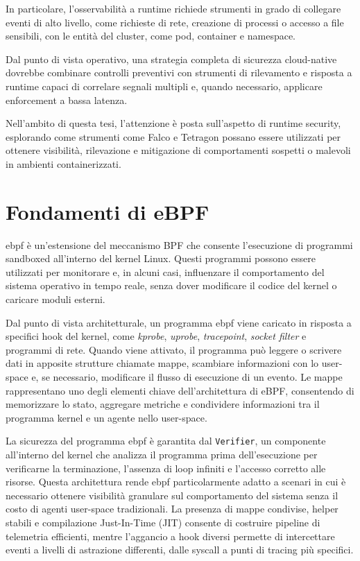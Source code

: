 \documentclass[12pt,a4paper,openright,twoside]{book}
\newcommand{\userspace}{\mbox{user-space}\xspace}
\begin{document}
In particolare, l'osservabilità a runtime richiede strumenti in grado di collegare eventi di alto livello, come richieste di rete, creazione di processi o accesso a file sensibili, con le entità del cluster, come pod, container e namespace.

Dal punto di vista operativo, una strategia completa di sicurezza cloud-native dovrebbe combinare controlli preventivi con strumenti di rilevamento e risposta a runtime capaci di correlare segnali multipli e, quando necessario, applicare enforcement a bassa latenza. 

Nell'ambito di questa tesi, l'attenzione è posta sull'aspetto di runtime security, esplorando come strumenti come Falco e Tetragon possano essere utilizzati per ottenere visibilità, rilevazione e mitigazione di comportamenti sospetti o malevoli in ambienti containerizzati.

\section{Fondamenti di eBPF}
\label{sec:eBPF-fundamentals}
\ac{ebpf} è un'estensione del meccanismo BPF che consente l'esecuzione di programmi sandboxed all'interno del kernel Linux. Questi programmi possono essere utilizzati per monitorare e, in alcuni casi, influenzare il comportamento del sistema operativo in tempo reale, senza dover modificare il codice del kernel o caricare moduli esterni.

Dal punto di vista architetturale, un programma \ac{ebpf} viene caricato in risposta a specifici hook del kernel, come \textit{kprobe}, \textit{uprobe}, \textit{tracepoint}, \textit{socket filter} e programmi di rete. Quando viene attivato, il programma può leggere o scrivere dati in apposite strutture chiamate mappe, scambiare informazioni con lo \userspace e, se necessario, modificare il flusso di esecuzione di un evento. Le mappe rappresentano uno degli elementi chiave dell'architettura di eBPF, consentendo di memorizzare lo stato, aggregare metriche e condividere informazioni tra il programma kernel e un agente nello \userspace.

La sicurezza del programma \ac{ebpf} è garantita dal \texttt{Verifier}, un componente all'interno del kernel che analizza il programma prima dell'esecuzione per verificarne la terminazione, l'assenza di loop infiniti e l'accesso corretto alle risorse. Questa architettura rende \ac{ebpf} particolarmente adatto a scenari in cui è necessario ottenere visibilità granulare sul comportamento del sistema senza il costo di agenti \userspace tradizionali. La presenza di mappe condivise, helper stabili e compilazione Just-In-Time (JIT) consente di costruire pipeline di telemetria efficienti, mentre l'aggancio a hook diversi permette di intercettare eventi a livelli di astrazione differenti, dalle syscall a punti di tracing più specifici.
\end{document}
